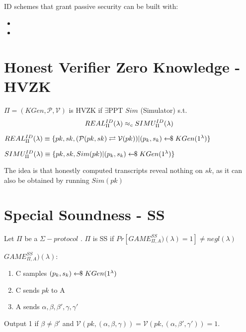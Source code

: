 ID schemes that grant passive security can be built with:
\begin{itemize}
    \item {}
    \item {}
\end{itemize}


\section{Honest Verifier Zero Knowledge - HVZK} \label{digsign:hvzk}
$\Pi = (KGen, \mathcal{P}, \mathcal{V})$ is HVZK if $\exists$PPT $Sim$ (Simulator) s.t.
\[ REAL_\Pi^{ID}(\lambda) \approx_c SIMU_\Pi^{ID}(\lambda) \]

$REAL_\Pi^{ID}(\lambda) \equiv \{ pk,sk,(\mathcal{P}(pk,sk) \rightleftarrows \mathcal{V}(pk)) \vert (p_k,s_k) \leftarrow\kern-0.42em{\$} \; KGen(1^\lambda) \} $

$SIMU_\Pi^{ID}(\lambda) \equiv \{ pk,sk,Sim(pk) \vert (p_k,s_k) \leftarrow\kern-0.42em{\$} \; KGen(1^\lambda) \} $

The idea is that honestly computed transcripts reveal nothing on $sk$, as it can also be obtained by running $Sim(pk)$


\section{Special Soundness - SS} \label{digsign:ss}
Let $\Pi$ be a $\Sigma-protocol$ . $\Pi$ is SS if $Pr[ GAME_{\Pi,A}^{SS})(\lambda) = 1 ] \neq negl(\lambda)$

$GAME_{\Pi,A}^{SS})(\lambda)$:
\begin{enumerate}
    \item C samples $(p_k,s_k) \leftarrow\kern-0.42em{\$} \; KGen(1^\lambda)$
    \item C sends $pk$ to A
    \item A sends $\alpha,\beta,\beta',\gamma,\gamma'$
\end{enumerate}
Output 1 if $\beta \neq \beta'$ and $\mathcal{V}(pk, (\alpha,\beta,\gamma)) = \mathcal{V}(pk, (\alpha,\beta',\gamma')) = 1$.